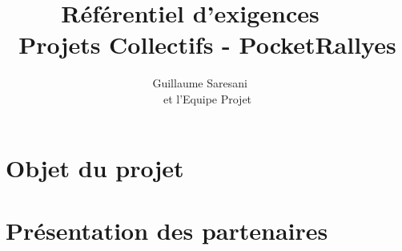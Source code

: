 \documentclass[a4paper,14pt]{article}
\title{Référentiel d'exigences ~~\\ Projets Collectifs - PocketRallyes}
\author{Guillaume Saresani ~~\\ et l'Equipe Projet}
\begin{document}
\maketitle
\begin{center}
\end{center}
\newpage
\tableofcontents
\newpage
\section{Objet du projet}

\newpage
\section{Présentation des partenaires}

\newpage
%
%
%
\end{document}
